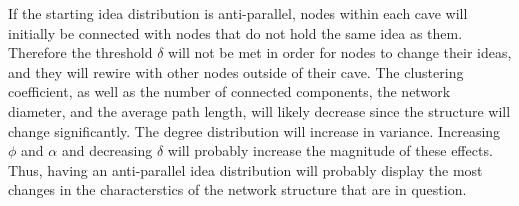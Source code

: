 If the starting idea distribution is anti-parallel, nodes within each cave will initially be connected with nodes that do not hold the same idea as them. Therefore the threshold $\delta$ will not be met in order for nodes to change their ideas, and they will rewire with other nodes outside of their cave. The clustering coefficient, as well as the number of connected components, the network diameter, and the average path length, will likely decrease since the structure will change significantly. The degree distribution will increase in variance. Increasing $\phi$ and $\alpha$ and decreasing $\delta$ will probably increase the magnitude of these effects. Thus, having an anti-parallel idea distribution will probably display the most changes in the characterstics of the network structure that are in question.



